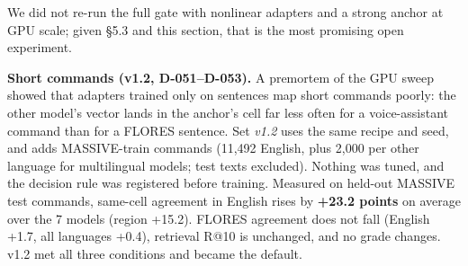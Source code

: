 \documentclass[
  10pt,
]{article}
\begin{document}
We did not re-run the full gate with nonlinear adapters and a strong
anchor at GPU scale; given \S{}5.3 and this section, that is the most
promising open experiment.

\textbf{Short commands (v1.2, D-051--D-053).} A premortem of the GPU
sweep showed that adapters trained only on sentences map short commands
poorly: the other model's vector lands in the anchor's cell far less
often for a voice-assistant command than for a FLORES sentence. Set
\emph{v1.2} uses the same recipe and seed, and adds MASSIVE-train
commands (11,492 English, plus 2,000 per other language for multilingual
models; test texts excluded). Nothing was tuned, and the decision rule
was registered before training. Measured on held-out MASSIVE test
commands, same-cell agreement in English rises by \textbf{+23.2 points}
on average over the 7 models (region +15.2). FLORES agreement does not
fall (English +1.7, all languages +0.4), retrieval R@10 is unchanged,
and no grade changes. v1.2 met all three conditions and became the
default.
\end{document}
